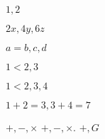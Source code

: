 \documentclass{article}
\begin{document}
$1,2$

$2x, 4y, 6z$

$a=b,c,d$

$1<2,3$

$1<2,3,4$

$1+2=3 , 3+4=7$

$+,-,\times$
$+,-,\times .$
$+,G$
\end{document}

